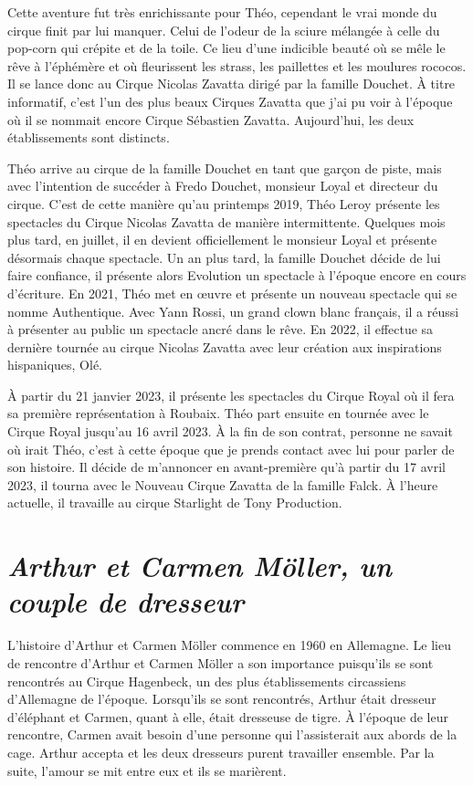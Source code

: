 Cette aventure fut très enrichissante pour Théo, cependant le vrai monde du cirque finit par lui manquer. Celui de l'odeur de la sciure mélangée à celle du pop-corn qui crépite et de la toile. Ce lieu d'une indicible beauté où se mêle le rêve à l'éphémère et où fleurissent les strass, les paillettes et les moulures rococos. Il se lance donc au Cirque Nicolas Zavatta dirigé par la famille Douchet. À titre informatif, c'est l'un des plus beaux Cirques Zavatta que j'ai pu voir à l’époque où il se nommait encore Cirque Sébastien Zavatta. Aujourd'hui, les deux établissements sont distincts.

Théo arrive au cirque de la famille Douchet en tant que garçon de piste, mais avec l'intention de succéder à Fredo Douchet, monsieur Loyal et directeur du cirque. C'est de cette manière qu'au printemps 2019, Théo Leroy présente les spectacles du Cirque Nicolas Zavatta de manière intermittente. Quelques mois plus tard, en juillet, il en devient officiellement le monsieur Loyal et présente désormais chaque spectacle. Un an plus tard, la famille Douchet décide de lui faire confiance, il présente alors Evolution un spectacle à l'époque encore en cours d'écriture. En 2021, Théo met en œuvre et présente un nouveau spectacle qui se nomme Authentique. Avec Yann Rossi, un grand clown blanc français, il a réussi à présenter au public un spectacle ancré dans le rêve. En 2022, il effectue sa dernière tournée au cirque Nicolas Zavatta avec leur création aux inspirations hispaniques, Olé.

À partir du 21 janvier 2023, il présente les spectacles du Cirque Royal où il fera sa première représentation à Roubaix. Théo part ensuite en tournée avec le Cirque Royal jusqu'au 16 avril 2023. À la fin de son contrat, personne ne savait où irait Théo, c'est à cette époque que je prends contact avec lui pour parler de son histoire. Il décide de m'annoncer en avant-première qu'à partir du 17 avril 2023, il tourna avec le Nouveau Cirque Zavatta de la famille Falck. À l’heure actuelle, il travaille au cirque Starlight de Tony Production. 

\section*{\textit{Arthur et Carmen Möller, un couple de dresseur  }}

L’histoire d’Arthur et Carmen Möller commence en 1960 en Allemagne. Le lieu de rencontre d’Arthur et Carmen Möller a son importance puisqu’ils se sont rencontrés au Cirque Hagenbeck, un des plus établissements circassiens d’Allemagne de l’époque. Lorsqu’ils se sont rencontrés, Arthur était dresseur d’éléphant et Carmen, quant à elle, était dresseuse de tigre. À l’époque de leur rencontre, Carmen avait besoin d’une personne qui l’assisterait aux abords de la cage. Arthur accepta et les deux dresseurs purent travailler ensemble. Par la suite, l’amour se mit entre eux et ils se marièrent.

